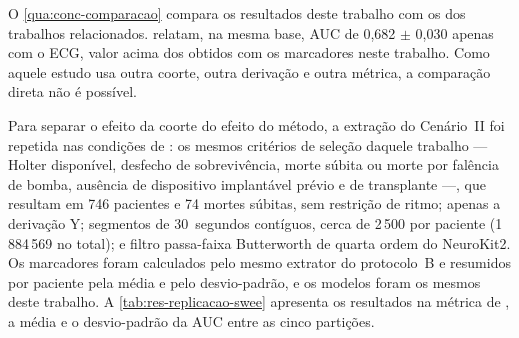 O \autoref{qua:conc-comparacao} compara os resultados deste trabalho com os
dos trabalhos relacionados.  relatam, na
mesma base, \gls{AUC} de 0,682 $\pm$ 0,030 apenas com o \gls{ECG}, valor
acima dos obtidos com os marcadores neste trabalho. Como aquele estudo usa
outra coorte, outra derivação e outra métrica, a comparação direta não é
possível.

Para separar o efeito da coorte do efeito do método, a extração do
Cenário~II foi repetida nas condições de : os mesmos
critérios de seleção daquele trabalho --- Holter disponível, desfecho de
sobrevivência, morte súbita ou morte por falência de bomba, ausência de
dispositivo implantável prévio e de transplante ---, que resultam em 746
pacientes e 74 mortes súbitas, sem restrição de ritmo; apenas a derivação
Y; segmentos de 30~segundos contíguos, cerca de 2\,500 por paciente (1\,884\,569
no total); e filtro passa-faixa Butterworth de quarta ordem do NeuroKit2.
Os marcadores foram calculados pelo mesmo extrator do protocolo~B e
resumidos por paciente pela média e pelo desvio-padrão, e os modelos foram
os mesmos deste trabalho. A \autoref{tab:res-replicacao-swee} apresenta os
resultados na métrica de , a média e o
desvio-padrão da \gls{AUC} entre as cinco partições.

